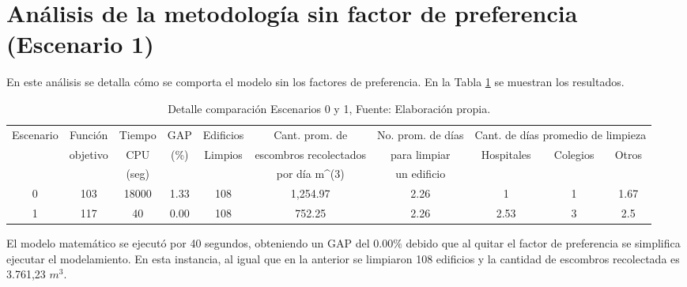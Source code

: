 \documentclass[12pt,a4paper]{article}
\begin{document}
\section{Análisis de la metodología sin factor de preferencia (Escenario 1)}

En este análisis se detalla cómo se comporta el modelo sin los factores de preferencia. En la Tabla \ref{tab:comp01} se muestran los resultados.



\begin{table}[h!]
\resizebox{15cm}{!} {
\begin{tabular}{c|c|c|c|c|c|c|c|c|c}
\hline
\multirow{3}{*}{Escenario} & Función                   & Tiempo & GAP                   & Edificios                & Cant. prom. de                 & No. prom. de días & \multicolumn{3}{c|}{Cant. de días promedio de limpieza}                          \\ \cline{8-10} 
                           & \multirow{2}{*}{objetivo} & CPU    & \multirow{2}{*}{(\%)} & \multirow{2}{*}{Limpios} & escombros recolectados         & para limpiar      & \multirow{2}{*}{Hospitales} & \multirow{2}{*}{Colegios} & \multirow{2}{*}{Otros} \\
                           &                           & (seg)  &                       &                          & por día m\textasciicircum{}(3) & un edificio       &                             &                           &                        \\ \hline
0                          & 103                       & 18000  & 1.33                  & 108                      & 1,254.97                       & 2.26              & 1                           & 1                         & 1.67                   \\ 
1                          & 117                       & 40     & 0.00                  & 108                      & 752.25                         & 2.26              & 2.53                        & 3                         & 2.5                    \\ \hline
\end{tabular}
}
\caption{Detalle comparación Escenarios 0 y 1, Fuente: Elaboración propia. }
\label{tab:comp01}
\end{table}

El modelo matemático se ejecutó por 40 segundos, obteniendo un GAP del $0.00\%$ debido que al quitar el factor de preferencia se simplifica ejecutar el modelamiento. En esta instancia, al igual que en la anterior se limpiaron 108 edificios y la cantidad de escombros recolectada es 3.761,23 $m^{3}$.
\end{document}

